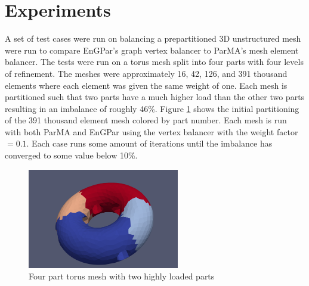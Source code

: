 \documentclass[a4paper]{article}
\begin{document}
\section{Experiments}
A set of test cases were run on balancing a prepartitioned 3D unstructured mesh were run to compare EnGPar's graph vertex balancer to ParMA's mesh element balancer. The tests were run on a torus mesh split into four parts with four levels of refinement. The meshes were approximately 16, 42, 126, and 391 thousand elements where each element was given the same weight of one. Each mesh is partitioned such that two parts have a much higher load than the other two parts resulting in an imbalance of roughly 46\%. Figure \ref{fig:torus} shows the initial partitioning of the 391 thousand element mesh colored by part number. Each mesh is run with both ParMA and EnGPar using the vertex balancer with the weight factor$=0.1$. Each case runs some amount of iterations until the imbalance has converged to some value below 10\%.


\begin{figure}[!ht]
  \centering
  \includegraphics[width=250px]{torus.png}
  \caption{Four part torus mesh with two highly loaded parts}
  \label{fig:torus}
\end{figure}
\end{document}
